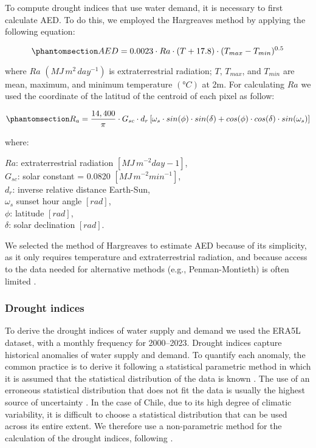 \documentclass[
  sn-nature,
  numbered]{sn-jnl}
\begin{document}
To compute drought indices that use water demand, it is necessary to
first calculate AED. To do this, we employed the Hargreaves method
\citep{Hargreaves1994, Hargreaves1985} by applying the following
equation:

\begin{equation}\phantomsection\label{eq-AED}{AED = 0.0023\cdot Ra\cdot (T+17.8)\cdot (T_{max}-T_{min})^{0.5}}\end{equation}

where \(Ra\) \((MJ\,m^2\, day^{-1})\) is extraterrestrial radiation;
\(T\), \(T_{max}\), and \(T_{min}\) are mean, maximum, and minimum
temperature \((°C)\) at 2m. For calculating \(Ra\) we used the
coordinate of the latitud of the centroid of each pixel as follow:

\begin{equation}\phantomsection\label{eq-Ra}{R_a = \frac{14,400}{\pi}\cdot G_{sc}\cdot d_r \left[\omega_s\cdot sin(\phi)\cdot sin(\delta)+cos(\phi)\cdot cos(\delta)\cdot sin(\omega_s) \right]}\end{equation}

where:

\(Ra\): extraterrestrial radiation \([MJ\, m^{-2} day-1]\),\\
\(G_{sc}\): solar constant = 0.0820 \([MJ\,m^{-2} min^{-1}]\),\\
\(d_r\): inverse relative distance Earth-Sun,\\
\(\omega_s\) sunset hour angle \([rad]\),\\
\(\phi\): latitude \([rad]\),\\
\(\delta\): solar declination \([rad]\).

We selected the method of Hargreaves to estimate AED because of its
simplicity, as it only requires temperature and extraterrestrial
radiation, and because access to the data needed for alternative methods
(e.g., Penman-Montieth) is often limited \citep{Vicente-Serrano2014}.

\subsubsection{Drought indices}\label{drought-indices}

To derive the drought indices of water supply and demand we used the
ERA5L dataset, with a monthly frequency for 2000--2023. Drought indices
capture historical anomalies of water supply and demand. To quantify
each anomaly, the common practice is to derive it following a
statistical parametric method in which it is assumed that the
statistical distribution of the data is known \citep{Heim2002}. The use
of an erroneous statistical distribution that does not fit the data is
usually the highest source of uncertainty \citep{Laimighofer2022}. In
the case of Chile, due to its high degree of climatic variability, it is
difficult to choose a statistical distribution that can be used across
its entire extent. We therefore use a non-parametric method for the
calculation of the drought indices, following \citep{Farahmand2015}.
\end{document}
